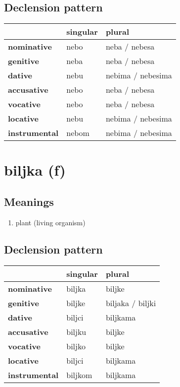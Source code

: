 \subsection*{Declension pattern}
\begin{tabularx}{\linewidth}{Xll}
\toprule
{} & singular &             plural \\
\midrule
\textbf{nominative  } &     nebo &      neba / nebesa \\
\textbf{genitive    } &     neba &      neba / nebesa \\
\textbf{dative      } &     nebu &  nebima / nebesima \\
\textbf{accusative  } &     nebo &      neba / nebesa \\
\textbf{vocative    } &     nebo &      neba / nebesa \\
\textbf{locative    } &     nebu &  nebima / nebesima \\
\textbf{instrumental} &    nebom &  nebima / nebesima \\
\bottomrule
\end{tabularx}

\filbreak
\section{biljka (f)}
\subsection*{Meanings}
\begin{enumerate}
\item plant (living organism)
\end{enumerate}
\subsection*{Declension pattern}
\begin{tabularx}{\linewidth}{Xll}
\toprule
{} & singular &            plural \\
\midrule
\textbf{nominative  } &   biljka &            biljke \\
\textbf{genitive    } &   biljke &  biljaka / biljki \\
\textbf{dative      } &   biljci &          biljkama \\
\textbf{accusative  } &   biljku &            biljke \\
\textbf{vocative    } &   biljko &            biljke \\
\textbf{locative    } &   biljci &          biljkama \\
\textbf{instrumental} &  biljkom &          biljkama \\
\bottomrule
\end{tabularx}

